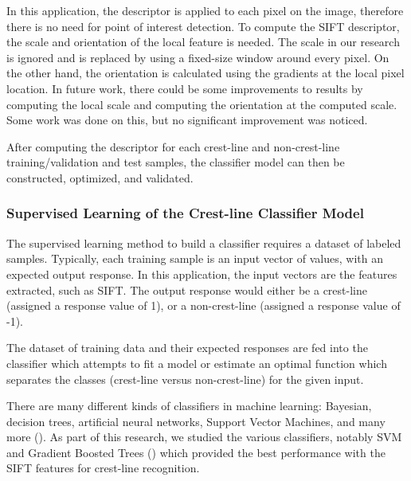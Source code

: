 In this application, the descriptor is applied to each pixel on the image, therefore there is no need for point of interest detection. To compute the SIFT descriptor, the scale and orientation of the local feature is needed. The scale in our research is ignored and is replaced by using a fixed-size window around every pixel. On the other hand, the orientation is calculated using the gradients at the local pixel location. In future work, there could be some improvements to results by computing the local scale and computing the orientation at the computed scale. Some work was done on this, but no significant improvement was noticed.

After computing the descriptor for each crest-line and non-crest-line training/validation and test samples, the classifier model can then be constructed, optimized, and validated.

\subsubsection{Supervised Learning of the Crest-line Classifier Model} \label{subsubsec:supervised_learning_classifiers}

The supervised learning method to build a classifier requires a dataset of labeled samples. Typically, each training sample is an input vector of values, with an expected output response. In this application, the input vectors are the features extracted, such as SIFT. The output response would either be a crest-line (assigned a response value of 1), or a non-crest-line (assigned a response value of -1).

The dataset of training data and their expected responses are fed into the classifier which attempts to fit a model or estimate an optimal function which separates the classes (crest-line versus non-crest-line) for the given input.

There are many different kinds of classifiers in machine learning: Bayesian, decision trees, artificial neural networks, Support Vector Machines, and many more (\cite{book_artificial_intelligence_modern_approach,2003_tackling_poor_assumptions_naive_bayes,1987_simplifying_decision_trees,1943_logical_calculus_ideas_immanent_nervous_activity,book_organization_of_behavior,1975_beyond_regression_prediction_analysis,1995_support_vector_networks,1995_support_vector_clustering}). As part of this research, we studied the various classifiers, notably SVM and Gradient Boosted Trees (\cite{1999_gradient_boosting_machine,1999_stochastic_gradient_boosting}) which provided the best performance with the SIFT features for crest-line recognition.

